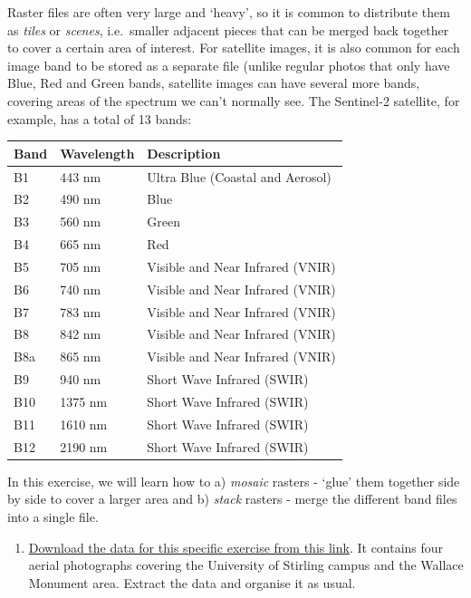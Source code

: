 \documentclass[
  letterpaper,
  DIV=11,
  numbers=noendperiod]{scrreprt}
\providecommand{\tightlist}{%
  \setlength{\itemsep}{0pt}\setlength{\parskip}{0pt}}\usepackage{longtable,booktabs,array}
\begin{document}
Raster files are often very large and `heavy', so it is common to
distribute them as \emph{tiles} or \emph{scenes}, i.e.~smaller adjacent
pieces that can be merged back together to cover a certain area of
interest. For satellite images, it is also common for each image band to
be stored as a separate file (unlike regular photos that only have Blue,
Red and Green bands, satellite images can have several more bands,
covering areas of the spectrum we can't normally see. The Sentinel-2
satellite, for example, has a total of 13 bands:

\begin{longtable}[]{@{}lll@{}}
\toprule\noalign{}
Band & Wavelength & Description \\
\midrule\noalign{}
\endhead
\bottomrule\noalign{}
\endlastfoot
B1 & 443 nm & Ultra Blue (Coastal and Aerosol) \\
B2 & 490 nm & Blue \\
B3 & 560 nm & Green \\
B4 & 665 nm & Red \\
B5 & 705 nm & Visible and Near Infrared (VNIR) \\
B6 & 740 nm & Visible and Near Infrared (VNIR) \\
B7 & 783 nm & Visible and Near Infrared (VNIR) \\
B8 & 842 nm & Visible and Near Infrared (VNIR) \\
B8a & 865 nm & Visible and Near Infrared (VNIR) \\
B9 & 940 nm & Short Wave Infrared (SWIR) \\
B10 & 1375 nm & Short Wave Infrared (SWIR) \\
B11 & 1610 nm & Short Wave Infrared (SWIR) \\
B12 & 2190 nm & Short Wave Infrared (SWIR) \\
\end{longtable}

In this exercise, we will learn how to a) \emph{mosaic} rasters - `glue'
them together side by side to cover a larger area and b) \emph{stack}
rasters - merge the different band files into a single file.

\begin{enumerate}
\def\labelenumi{(\arabic{enumi})}
\setcounter{enumi}{175}
\tightlist
\item
  \href{https://stir-my.sharepoint.com/:u:/g/personal/ala2_stir_ac_uk/EWWIMudbgUlImqIZ5ZYoVw4BNhL1rRn5swLLTvJnli2r_A?e=NIVOuW}{Download
  the data for this specific exercise from this link}. It contains four
  aerial photographs covering the University of Stirling campus and the
  Wallace Monument area. Extract the data and organise it as usual.
\end{enumerate}
\end{document}
